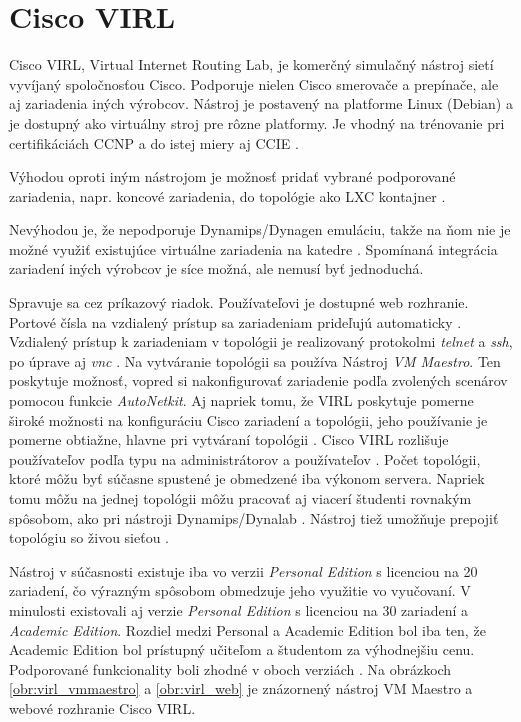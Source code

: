 \section{Cisco VIRL}

Cisco VIRL, Virtual Internet Routing Lab, je komerčný simulačný nástroj sietí vyvíjaný spoločnosťou Cisco. Podporuje nielen Cisco smerovače a prepínače, ale aj zariadenia iných výrobcov. Nástroj je postavený na platforme Linux (Debian) a je dostupný ako virtuálny stroj pre rôzne platformy. Je vhodný na trénovanie pri certifikáciách CCNP a do istej miery aj CCIE \cite{virl_cisco}.

Výhodou oproti iným nástrojom je možnosť pridať vybrané podporované zariadenia, napr. koncové zariadenia, do topológie ako LXC kontajner \cite{virl_cisco}.

Nevýhodou je, že nepodporuje Dynamips/Dynagen emuláciu, takže na ňom nie je možné využiť existujúce virtuálne zariadenia na katedre \cite{virl_cisco}. Spomínaná integrácia zariadení iných výrobcov je síce možná, ale nemusí byť jednoduchá.

Spravuje sa cez príkazový riadok. Používateľovi je dostupné web rozhranie. Portové čísla na vzdialený prístup sa zariadeniam prideľujú automaticky \cite{virl_interfacett_1}. Vzdialený prístup k zariadeniam v topológii je realizovaný protokolmi \emph{telnet} a \emph{ssh}, po úprave aj \emph{vnc} \cite{virl_ciscoskills, virl_speaknetworks}. Na vytváranie topológii sa používa Nástroj \emph{VM Maestro}. Ten poskytuje možnosť, vopred si nakonfigurovať zariadenie podľa zvolených scenárov pomocou funkcie \emph{AutoNetkit}. Aj napriek tomu, že VIRL poskytuje pomerne široké možnosti na konfiguráciu Cisco zariadení a topológii, jeho používanie je pomerne obtiažne, hlavne pri vytváraní topológii \cite{virl_interfacett_1, virl_interfacett_2}. Cisco VIRL rozlišuje používateľov podľa typu na administrátorov a používateľov \cite{virl_cisco_features}. Počet topológii, ktoré môžu byť súčasne spustené je obmedzené iba výkonom servera. Napriek tomu môžu na jednej topológii môžu pracovať aj viacerí študenti rovnakým spôsobom, ako pri nástroji Dynamips/Dynalab \cite{virl_interfacett_2}. Nástroj tiež umožňuje prepojiť topológiu so živou sieťou \cite{virl_speaknetworks}. 

Nástroj v súčasnosti existuje iba vo verzii \emph{Personal Edition} s licenciou na 20 zariadení, čo výrazným spôsobom obmedzuje jeho využitie vo vyučovaní. V minulosti existovali aj verzie \emph{Personal Edition} s licenciou na 30 zariadení a \emph{Academic Edition}. Rozdiel medzi Personal a Academic Edition bol iba ten, že Academic Edition bol prístupný učiteľom a študentom za výhodnejšiu cenu. Podporované funkcionality boli zhodné v oboch verziách \cite{virl_edition_differences}. Na obrázkoch \ref{obr:virl_vmmaestro} a \ref{obr:virl_web} je znázornený nástroj VM Maestro a webové rozhranie Cisco VIRL.

